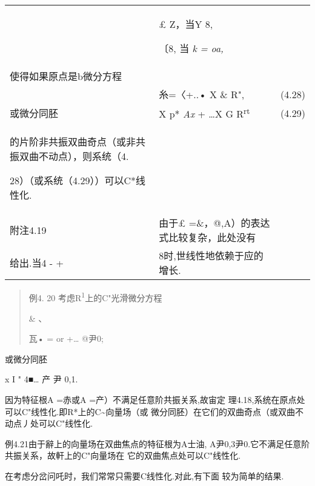 \documentclass{article}
\begin{document}
\begin{longtable}[]{@{}lll@{}}
\toprule
\endhead
\begin{minipage}[t]{0.30\columnwidth}\raggedright
\strut
\end{minipage} & \begin{minipage}[t]{0.30\columnwidth}\raggedright
£ Z，当Y 8,

〔8, 当 \emph{k = oa,}\strut
\end{minipage} & \begin{minipage}[t]{0.30\columnwidth}\raggedright
\strut
\end{minipage}\tabularnewline
使得如果原点是b微分方程 & &\tabularnewline
& 糸=〈+..• X \& R", & (4.28)\tabularnewline
或微分同胚 & X p* \emph{Ax} + \ldots{}X G R\textsuperscript{rt} &
(4.29)\tabularnewline
\begin{minipage}[t]{0.30\columnwidth}\raggedright
的片阶非共振双曲奇点（或非共振双曲不动点），则系统（4.

28）（或系统（4.29））可以C*线性化.\textbar{}\strut
\end{minipage} & \begin{minipage}[t]{0.30\columnwidth}\raggedright
\strut
\end{minipage} & \begin{minipage}[t]{0.30\columnwidth}\raggedright
\strut
\end{minipage}\tabularnewline
附注4.19 & 由于£ =\&，@,A）的表达式比较复杂，此处没有 &\tabularnewline
给出.当4 - + & 8时,世线性地依赖于应的增长. &\tabularnewline
\bottomrule
\end{longtable}

\begin{quote}
例4. 20 考虑R\textsuperscript{1}上的C"光滑微分方程

\& 、

瓦• = or +\ldots{} @尹0;
\end{quote}

或微分同胚

x I " 4■\ldots{} \textbar{}产\textbar{} 尹 0,1.

因为特征根A =赤或A =产）不满足任意阶共振关系,故宙定
理4.18,系统在原点处可以C"线性化.即R*上的C\textasciitilde{}向量场（或
微分同胚）在它们的双曲奇点（或双曲不动点丿处可以C"线性化.

例4.21由于辭上的向量场在双曲焦点的特征根为A士油,
A尹0,3尹0.它不满足任意阶共振关系，故軒上的C"向量场在
它的双曲焦点处可以C"线性化.

在考虑分岔问吒时，我们常常只需要C线性化.对此,有下面 较为简单的结果.
\end{document}
